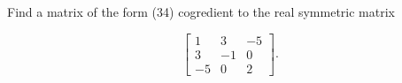 Find a matrix of the form (34) cogredient to the real symmetric matrix

$$\begin{bmatrix}
1 & 3 & -5 \\
3 & -1 & 0 \\
-5 & 0 & 2
\end{bmatrix}.$$
